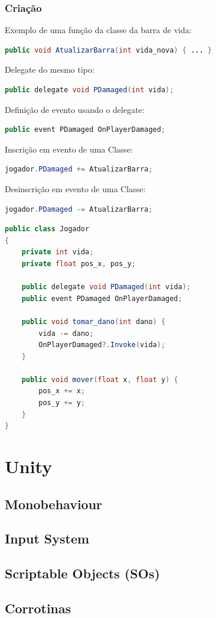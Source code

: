 \documentclass{beamer}
\begin{document}
	\begin{frame}[fragile]
		\frametitle{Criação}

		Exemplo de uma função da classe da barra de vida:
		\begin{lstlisting}[language=Java,basicstyle=\ttfamily,keywordstyle=\color{blue}]
public void AtualizarBarra(int vida_nova) { ... }
		\end{lstlisting}

		Delegate do mesmo tipo:
		\begin{lstlisting}[language=Java,basicstyle=\ttfamily,keywordstyle=\color{blue}]
public delegate void PDamaged(int vida);
		\end{lstlisting}

		Definição de evento usando o delegate:
		\begin{lstlisting}[language=Java,basicstyle=\ttfamily,keywordstyle=\color{blue}]
public event PDamaged OnPlayerDamaged;
		\end{lstlisting}

		Inscrição em evento de uma Classe:
		\begin{lstlisting}[language=Java,basicstyle=\ttfamily,keywordstyle=\color{blue}]
jogador.PDamaged += AtualizarBarra;
		\end{lstlisting}

		Desinscrição em evento de uma Classe:
		\begin{lstlisting}[language=Java,basicstyle=\ttfamily,keywordstyle=\color{blue}]
jogador.PDamaged -= AtualizarBarra;
		\end{lstlisting}

	\end{frame}

	\begin{frame}[fragile]
		\begin{lstlisting}[language=Java,basicstyle=\ttfamily,keywordstyle=\color{blue}]
public class Jogador
{
    private int vida;
    private float pos_x, pos_y;

    public delegate void PDamaged(int vida);
    public event PDamaged OnPlayerDamaged;

    public void tomar_dano(int dano) {
        vida -= dano;
        OnPlayerDamaged?.Invoke(vida);
    }

    public void mover(float x, float y) {
        pos_x += x;
        pos_y += y;
    }
}
		\end{lstlisting}
	\end{frame}

	\section{Unity}
	\frame{\sectionpage}

	\subsection{Monobehaviour}
	\subsection{Input System}
	\subsection{Scriptable Objects (SOs)}
	\subsection{Corrotinas}
\end{document}
